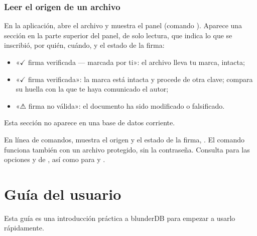 \documentclass[letterpaper,10pt,spanish]{sphinxmanual}
\begin{document}
\subsubsection{Leer el origen de un archivo}
\label{\detokenize{manuel:lire-l-origine-d-un-fichier}}
\sphinxAtStartPar
En la aplicación, abre el archivo y muestra el panel  (comando ). Aparece una sección  en la parte superior del panel, de solo lectura, que indica lo que se inscribió, por quién, cuándo, y el estado de la firma:
\begin{itemize}
\item {} 
\sphinxAtStartPar
«\(\checkmark\) firma verificada — marcada por ti»: el archivo lleva tu marca, intacta;

\item {} 
\sphinxAtStartPar
«\(\checkmark\) firma verificada»: la marca está intacta y procede de otra clave; compara su huella con la que te haya comunicado el autor;

\item {} 
\sphinxAtStartPar
«⚠ firma no válida»: el documento ha sido modificado o falsificado.

\end{itemize}

\sphinxAtStartPar
Esta sección no aparece en una base de datos corriente.

\sphinxAtStartPar
En línea de comandos,  muestra el origen y el estado de la firma, . El comando funciona también con un archivo protegido, sin la contraseña. Consulta  para las opciones  y  de , así como para  y .

\sphinxstepscope


\section{Guía del usuario}
\label{\detokenize{guide_utilisateur:guide-utilisateur}}\label{\detokenize{guide_utilisateur:id1}}\label{\detokenize{guide_utilisateur::doc}}
\sphinxAtStartPar
Esta guía es una introducción práctica a blunderDB para empezar a usarlo rápidamente.
\end{document}
